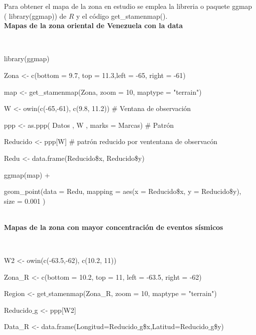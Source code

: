 \documentclass[12pt]{report}
\begin{document}
{{{{{{{		Para obtener el mapa de la zona en estudio se emplea la libreria o paquete ggmap ({{\ttfamily 
		library(ggmap)}})  de  $R$  y  el  código   {{\ttfamily get\_stamenmap()}}.\\	
		
		
		\textbf{Mapas de la zona oriental de Venezuela con la data}{\label{M-codigo}\\
			
				   
			
			{ \scriptsize  { \ttfamily 
				   library(ggmap) 
				   	
				   Zona <- c(bottom  = 9.7, top = 11.3,left  = -65, right = -61)
				   	
				   map <- get\_stamenmap(Zona, zoom = 10, maptype = "terrain")
				   	
				   W <- owin(c(-65,-61), c(9.8, 11.2))  \#  Ventana de observación
				   	
				   ppp <- as.ppp( Datos , W , marks = Marcas)   \# Patrón
					
				   Reducido <- ppp[W]	 \# patrón reducido por vententana de observacón			
				   				    
				   Redu <-  data.frame(Reducido\$x, Reducido\$y) 
				   
				   ggmap(map) +                                    \vspace{-0,15 cm} 
					
				   geom\_point(data = Redu, mapping = aes(x = Reducido\$x, y = Reducido\$y), size = 0.001 )   }} \\
			
				
			
		
			
		\textbf{Mapas de la zona con mayor concentración de eventos sísmicos}{\label{M-codigo}\\
			
				
			{ \scriptsize  { \ttfamily 
				
		
		            
		             
		W2 <- owin(c(-63.5,-62), c(10.2, 11))
		
		Zona\_R <- c(bottom  = 10.2, top = 11, left  = -63.5, right = -62)
		
		Region <- get$\_$stamenmap(Zona\_R, zoom = 10, maptype = "terrain")
			
	
				
		Reducido$\_$g <- ppp[W2]
		
		Data\_R <- data.frame(Longitud=Reducido$\_$g\$x,Latitud=Reducido$\_$g\$y)  
		
}}}}}}}}}}}
\end{document}
